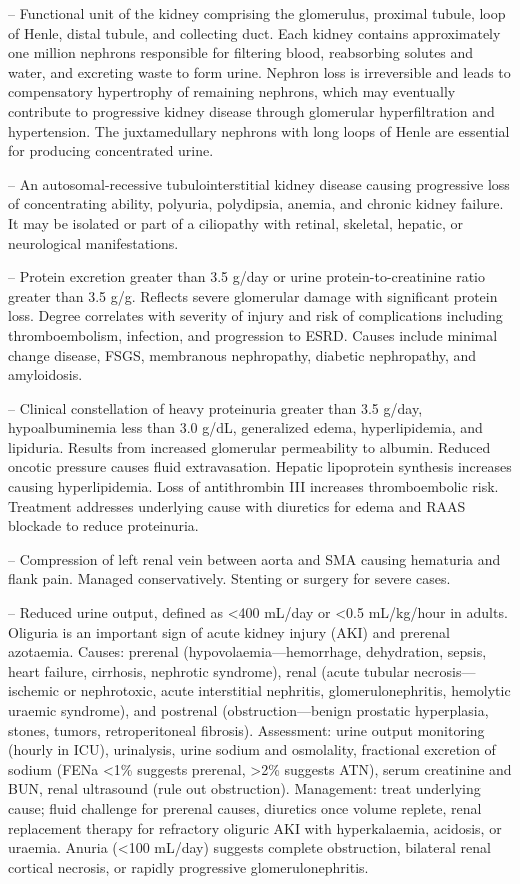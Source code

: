 -- Functional unit of the kidney comprising the glomerulus, proximal tubule, loop of Henle, distal tubule, and collecting duct. Each kidney contains approximately one million nephrons responsible for filtering blood, reabsorbing solutes and water, and excreting waste to form urine. Nephron loss is irreversible and leads to compensatory hypertrophy of remaining nephrons, which may eventually contribute to progressive kidney disease through glomerular hyperfiltration and hypertension. The juxtamedullary nephrons with long loops of Henle are essential for producing concentrated urine.

-- An autosomal-recessive tubulointerstitial kidney disease causing progressive loss of concentrating ability, polyuria, polydipsia, anemia, and chronic kidney failure. It may be isolated or part of a ciliopathy with retinal, skeletal, hepatic, or neurological manifestations.

-- Protein excretion greater than 3.5 g/day or urine protein-to-creatinine ratio greater than 3.5 g/g. Reflects severe glomerular damage with significant protein loss. Degree correlates with severity of injury and risk of complications including thromboembolism, infection, and progression to ESRD. Causes include minimal change disease, FSGS, membranous nephropathy, diabetic nephropathy, and amyloidosis.

-- Clinical constellation of heavy proteinuria greater than 3.5 g/day, hypoalbuminemia less than 3.0 g/dL, generalized edema, hyperlipidemia, and lipiduria. Results from increased glomerular permeability to albumin. Reduced oncotic pressure causes fluid extravasation. Hepatic lipoprotein synthesis increases causing hyperlipidemia. Loss of antithrombin III increases thromboembolic risk. Treatment addresses underlying cause with diuretics for edema and RAAS blockade to reduce proteinuria.

-- Compression of left renal vein between aorta and SMA causing hematuria and flank pain. Managed conservatively. Stenting or surgery for severe cases.

-- Reduced urine output, defined as <400 mL/day or <0.5 mL/kg/hour in adults. Oliguria is an important sign of acute kidney injury (AKI) and prerenal azotaemia. Causes: prerenal (hypovolaemia—hemorrhage, dehydration, sepsis, heart failure, cirrhosis, nephrotic syndrome), renal (acute tubular necrosis—ischemic or nephrotoxic, acute interstitial nephritis, glomerulonephritis, hemolytic uraemic syndrome), and postrenal (obstruction—benign prostatic hyperplasia, stones, tumors, retroperitoneal fibrosis). Assessment: urine output monitoring (hourly in ICU), urinalysis, urine sodium and osmolality, fractional excretion of sodium (FENa <1\% suggests prerenal, >2\% suggests ATN), serum creatinine and BUN, renal ultrasound (rule out obstruction). Management: treat underlying cause; fluid challenge for prerenal causes, diuretics once volume replete, renal replacement therapy for refractory oliguric AKI with hyperkalaemia, acidosis, or uraemia. Anuria (<100 mL/day) suggests complete obstruction, bilateral renal cortical necrosis, or rapidly progressive glomerulonephritis.

